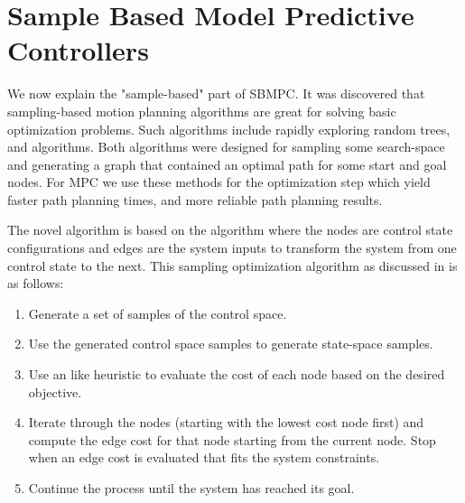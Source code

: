 \documentclass[main.tex]{subfile}
\begin{document}

\section{Sample Based Model Predictive Controllers} 
\label{sec:sample_based_model_predictive_controllers}

We now explain the "sample-based" part of SBMPC. It was discovered that
sampling-based motion planning algorithms are great for solving basic
optimization problems. Such algorithms include rapidly exploring random trees,
and \Astar algorithms. Both algorithms were designed for sampling some
search-space and generating a graph that contained an optimal path for some
start and goal nodes. For MPC we use these methods for the optimization step
which yield faster path planning times, and more reliable path planning results.

The novel algorithm is based on the \Astar algorithm where the nodes are control
state configurations and edges are the system inputs to transform the system
from one control state to the next.  This sampling optimization algorithm as
discussed in \cite{uphill} is as follows: 

\begin{enumerate}
	\item Generate a set of samples of the control space.
	\item Use the generated control space samples to generate state-space samples.
	\item Use an \Astar like heuristic to evaluate the cost of each node based on
		the desired objective.
	\item Iterate through the nodes (starting with the lowest cost node first) and
		compute the edge cost for that node starting from the current node. Stop
		when an edge cost is evaluated that fits the system constraints.
	\item Continue the process until the system has reached its goal.
\end{enumerate}

\end{document}
